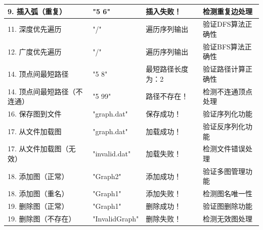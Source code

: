 \documentclass[supercite]{Experimental_Report}
\theoremstyle{definition}
\begin{document}
\begin{center}
\begin{tabularx}{\textwidth}{|l|X|X|X|}
        \hline
        9. 插入弧（重复） & "5 6" & 插入失败！ & 检测重复边处理 \\
        \hline
        11. 深度优先遍历 & "/" & 遍历序列输出 & 验证DFS算法正确性 \\
        \hline
        12. 广度优先遍历 & "/" & 遍历序列输出 & 验证BFS算法正确性 \\
        \hline
        14. 顶点间最短路径 & "5 8" & 最短路径长度为：2 & 验证路径计算正确性 \\
        \hline
        14. 顶点间最短路径（不连通） & "5 99" & 路径不存在！ & 检测不连通顶点处理 \\
        \hline
        16. 保存图到文件 & "graph.dat" & 保存成功！ & 验证序列化功能 \\
        \hline
        17. 从文件加载图 & "graph.dat" & 加载成功！ & 验证反序列化功能 \\
        \hline
        17. 从文件加载图（无效） & "invalid.dat" & 加载失败！ & 检测文件错误处理 \\
        \hline
        18. 添加图（正常） & "Graph2" & 添加成功！ & 验证多图管理功能 \\
        \hline
        18. 添加图（重名） & "Graph1" & 添加失败！ & 检测图名唯一性 \\
        \hline
        19. 删除图（正常） & "Graph1" & 删除成功！ & 验证图删除功能 \\
        \hline
        19. 删除图（不存在） & "InvalidGraph" & 删除失败！ & 检测无效图处理 \\
        \hline
    \end{tabularx}
\end{center}
\end{document}
